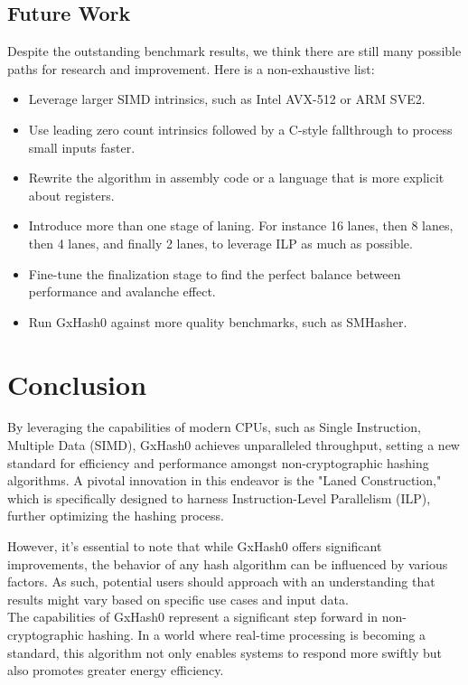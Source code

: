 \documentclass[10pt]{article}
\begin{document}
\subsection{Future Work}
Despite the outstanding benchmark results, we think there are still many possible paths for research and improvement. Here is a non-exhaustive list:
\begin{itemize}
    \item Leverage larger SIMD intrinsics, such as Intel AVX-512 or ARM SVE2.
    \item Use leading zero count intrinsics followed by a C-style fallthrough to process small inputs faster.
    \item Rewrite the algorithm in assembly code or a language that is more explicit about registers.
    \item Introduce more than one stage of laning. For instance 16 lanes, then 8 lanes, then 4 lanes, and finally 2 lanes, to leverage ILP as much as possible.
    \item Fine-tune the finalization stage to find the perfect balance between performance and avalanche effect.
    \item Run GxHash0 against more quality benchmarks, such as SMHasher\cite{smhasher}.
\end{itemize}

\section{Conclusion}

By leveraging the capabilities of modern CPUs, such as Single Instruction, Multiple Data (SIMD), GxHash0 achieves unparalleled throughput, setting a new standard for efficiency and performance amongst non-cryptographic hashing algorithms. A pivotal innovation in this endeavor is the "Laned Construction," which is specifically designed to harness Instruction-Level Parallelism (ILP), further optimizing the hashing process.

However, it's essential to note that while GxHash0 offers significant improvements, the behavior of any hash algorithm can be influenced by various factors. As such, potential users should approach with an understanding that results might vary based on specific use cases and input data.\\

The capabilities of GxHash0 represent a significant step forward in non-cryptographic hashing. In a world where real-time processing is becoming a standard, this algorithm not only enables systems to respond more swiftly but also promotes greater energy efficiency.



\end{document}
